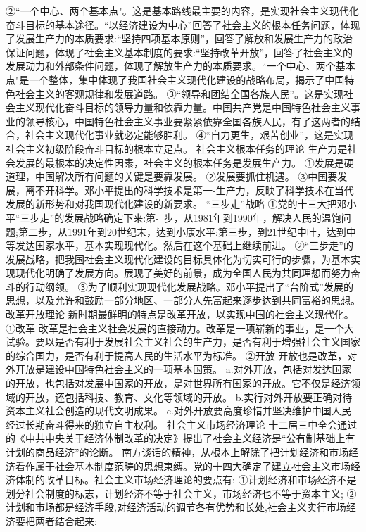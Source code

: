\documentclass[12pt,UTF8]{ctexart}
\begin{document}
②“一个中心、两个基本点"。这是基本路线最主要的内容，是实现社会主义现代化奋斗目标的基本途径。“以经济建设为中心”回答了社会主义的根本任务问题，体现了发展生产力的本质要求:“坚持四项基本原则”，回答了解放和发展生产力的政治保证问题，体现了社会主义基本制度的要求:“坚持改革开放”，回答了社会主义的发展动力和外部条件问题，体现了解放生产力的本质要求。“一个中心、两个基本点"是一个整体，集中体现了我国社会主义现代化建设的战略布局，揭示了中国特色社会主义的客观规律和发展道路。
③“领导和团结全国各族人民”。这是实现社会主义现代化奋斗目标的领导力量和依靠力量。中国共产党是中国特色社会主义事业的领导核心，中国特色社会主义事业要紧紧依靠全国各族人民，有了这两者的结合，社会主义现代化事业就必定能够胜利。
④“自力更生，艰苦创业”，这是实现社会主义初级阶段奋斗目标的根本立足点。
社会主义根本任务的理论
生产力是社会发展的最根本的决定性因素，社会主义的根本任务是发展生产力。
①发展是硬道理，中国解决所有问题的关键是要靠发展。
②发展要抓住机遇。
③中国要发展，离不开科学。邓小平提出的科学技术是第一-生产力，反映了科学技术在当代发展的新形势和对我国现代化建设的新要求。
“三步走”战略
①党的十三大把邓小平“三步走”的发展战略确定下来:第- 步，从1981年到1990年，解决人民的温饱问题;第二步，从1991年到20世纪末，达到小康水平:第三步，到21世纪中叶，达到中等发达国家水平，基本实现现代化。然后在这个基础上继续前进。
②“三步走”的发展战略，把我国社会主义现代化建设的目标具体化为切实可行的步骤，为基本实现现代化明确了发展方向。展现了美好的前景，成为全国人民为共同理想而努力奋斗的行动纲领。
③为了顺利实现现代化发展战略。邓小平提出了“台阶式”发展的思想，以及允许和鼓励一部分地区、一部分人先富起来逐步达到共同富裕的思想。
改革开放理论
新时期最鲜明的特点是改革开放，以实现中国的社会主义现代化。
①改革
改革是社会主义社会发展的直接动力。改革是一项崭新的事业，是一个大试验。要以是否有利于发展社会主义社会的生产力，是否有利于增强社会主义国家的综合国力，是否有利于提高人民的生活水平为标准。
②开放
开放也是改革，对外开放是建设中国特色社会主义的一项基本国策。
a.对外开放，包括对发达国家的开放，也包括对发展中国家的开放，是对世界所有国家的开放。它不仅是经济领域的开放，还包括科技、教育、文化等领域的开放。
b.实行对外开放要正确对待资本主义社会创造的现代文明成果。
c.对外开放要高度珍惜并坚决维护中国人民经过长期奋斗得来的独立自主权利。
社会主义市场经济理论
十二届三中全会通过的《中共中央关于经济体制改革的决定》提出了社会主义经济是“公有制基础上有计划的商品经济”的论断。
南方谈话的精神，从根本上解除了把计划经济和市场经济看作属于社会基本制度范畴的思想束缚。党的十四大确定了建立社会主义市场经济体制的改革目标。社会主义市场经济理论的要点有:
①计划经济和市场经济不是划分社会制度的标志，计划经济不等于社会主义，市场经济也不等于资本主义;
②计划和市场都是经济手段,对经济活动的调节各有优势和长处,社会主义实行市场经济要把两者结合起来:
\end{document}
